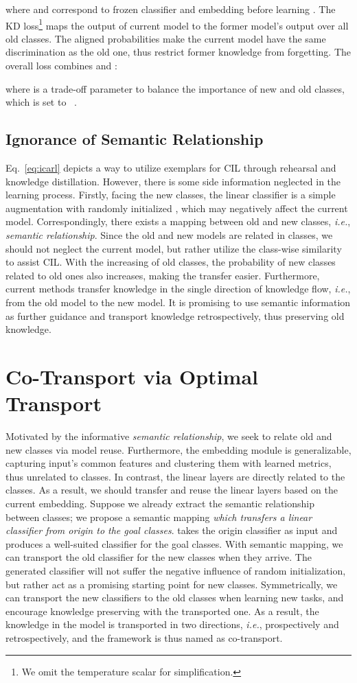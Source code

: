 \documentclass[sigconf]{acmart}
\newcommand{\ie}{\emph{i.e.}}
\begin{document}
where  and  correspond to frozen classifier and embedding before learning .
The KD loss\footnote{We omit the temperature scalar  for simplification. } maps the output of current model to the former model's output over all old classes. 
The aligned probabilities make the current model have  the same  discrimination as the old one, thus restrict former knowledge from forgetting. 
The overall loss combines  and :

where  is a trade-off parameter to balance the importance of new and old classes, which is set to  ~\cite{wu2019large}.

\subsection{Ignorance of Semantic Relationship }
Eq.~\ref{eq:icarl} depicts a way to utilize exemplars for CIL through rehearsal and knowledge distillation. However, there is some side information neglected in the learning process. Firstly, facing the new classes, the linear classifier  is a simple augmentation  with randomly initialized , which may negatively affect the current model. 
Correspondingly, there exists a mapping between old and new classes, \ie, \emph{semantic relationship}. Since the old and new models are related in classes, we should not neglect the current model, but rather utilize the class-wise similarity to assist CIL. 
With the increasing of old classes, the probability of new classes related to old ones also increases, making the transfer easier.
Furthermore, current methods transfer knowledge in the single direction of knowledge flow, \ie, from the old model to the new model. It is promising to use semantic information as further guidance
and transport knowledge retrospectively, thus preserving old knowledge.

\section{Co-Transport via Optimal Transport}
Motivated by the informative \emph{semantic relationship}, we seek to relate old and new classes via model reuse. Furthermore, the embedding module  is generalizable, capturing input's common features and clustering them with learned metrics, thus unrelated to classes. In contrast, the linear layers  are directly related to the classes. As a result, we should transfer and reuse the linear layers based on the current embedding. 
Suppose we already extract the semantic relationship between  classes; we propose a semantic mapping  \emph{which transfers a linear classifier from origin to the goal classes}.   takes the origin classifier as input and produces a well-suited classifier for the goal classes. With semantic mapping, we can transport the old classifier for the new classes when they arrive. The generated classifier will not suffer the negative influence of random initialization, but rather act as a promising starting point for new classes. 
Symmetrically, we can transport the new classifiers to the old classes when learning new tasks, and encourage knowledge preserving with the transported one. As a result, the knowledge in the model is transported in two directions, \ie, prospectively and retrospectively, and the framework is thus named as co-transport.
\end{document}
